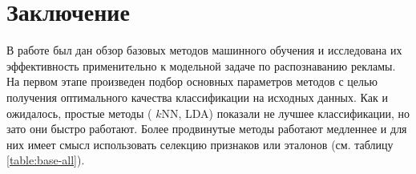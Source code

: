 \section{Заключение}
В работе был дан обзор базовых методов машинного обучения и исследована их эффективность применительно к модельной задаче по распознаванию рекламы. На первом этапе произведен подбор основных параметров методов с целью получения оптимального качества классификации на исходных данных. Как и ожидалось, простые методы (
\(k\)NN, LDA) показали не лучшее классификации, но зато они быстро работают. Более продвинутые методы работают медленнее и для них имеет смысл использовать селекцию признаков или эталонов (см. таблицу \ref{table:base-all}). 
\par
